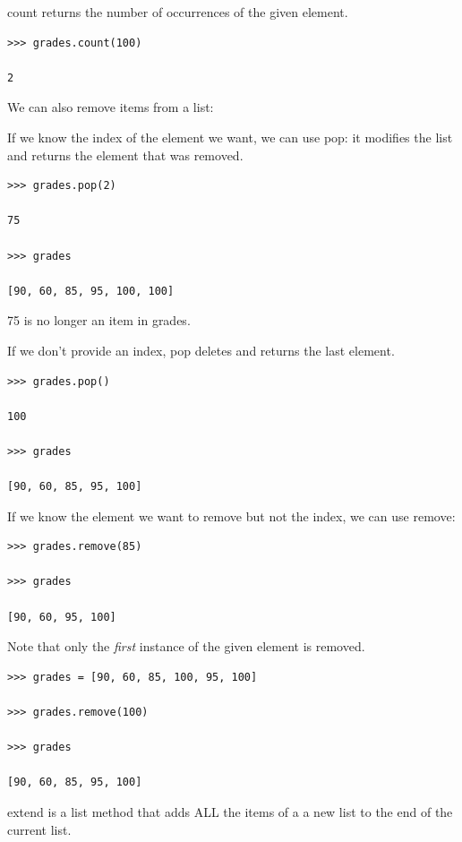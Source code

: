 \documentclass{article}
\begin{document}
count returns the number of occurrences of the given element. 

\begin{lstlisting}
>>> grades.count(100)

2

\end{lstlisting}

We can also remove items from a list:

If we know the index of the element we want, we can use pop: it modifies the list and returns the element that was removed.

\begin{lstlisting}
>>> grades.pop(2)

75

>>> grades

[90, 60, 85, 95, 100, 100]

\end{lstlisting}

75 is no longer an item in grades.

If we don’t provide an index, pop deletes and returns the last element.

\begin{lstlisting}
>>> grades.pop()

100

>>> grades

[90, 60, 85, 95, 100]

\end{lstlisting}

If we know the element we want to remove but not the index, we can use remove:

\begin{lstlisting}
>>> grades.remove(85)

>>> grades

[90, 60, 95, 100]

\end{lstlisting}

Note that only the \textit{first} instance of the given element is removed.

\begin{lstlisting}
>>> grades = [90, 60, 85, 100, 95, 100]

>>> grades.remove(100)

>>> grades

[90, 60, 85, 95, 100]

\end{lstlisting}

extend is a list method that adds ALL the items of a a new list to the end of the current list.
\end{document}
